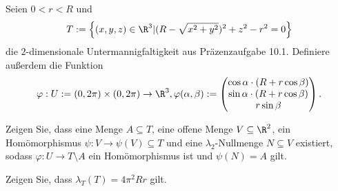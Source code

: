 \begin{Problem}
	Seien $0<r<R$ und
	\[
	T:=\left\{ (x,y,z)\in \R^3|(R-\sqrt{x^2+y^2})^2+z^2-r^2=0 \right\} 
\]
die $2$-dimensionale Untermannigfaltigkeit aus Präzenzaufgabe 10.1. Definiere außerdem die Funktion
\[
\varphi:U:=(0,2\pi)\times (0,2\pi)\to \R^3,\varphi(\alpha,\beta):=\begin{pmatrix} \cos\alpha \cdot (R+r\cos\beta)\\ \sin\alpha \cdot (R+r\cos\beta) \\ r\sin\beta \end{pmatrix} 
.\] 
\begin{parts}
\item Zeigen Sie, dass eine Menge $A\subseteq T$, eine offene Menge $V\subseteq \R^2$, ein Homömorphismus $\psi:V\to \psi(V)\subseteq T$ und eine $\lambda_2$-Nullmenge $N\subseteq V$ existiert, sodass $\varphi:U\to T\setminus A$ ein Homömorphismus ist und $\psi(N)=A$ gilt.
\item Zeigen Sie, dass $\lambda_T(T)=4\pi^2 Rr$ gilt.
\end{parts}
\end{Problem}
